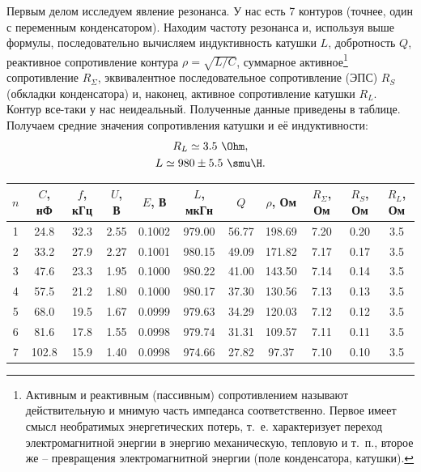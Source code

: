 \documentclass{../lab_class}
\begin{document}
Первым делом исследуем явление резонанса. У нас есть 7 контуров (точнее, один с переменным конденсатором). Находим частоту резонанса и, используя выше формулы, последовательно вычисляем индуктивность катушки $L$, добротность $Q$, реактивное сопротивление контура $\rho = \sqrt{L/C}$, суммарное активное\footnote{Активным и реактивным (пассивным) сопротивлением называют действительную и мнимую часть импеданса соответственно. Первое имеет смысл необратимых энергетических потерь, т.~е. характеризует переход электромагнитной энергии в энергию механическую, тепловую и т.~п., второе же -- превращения электромагнитной энергии (поле конденсатора, катушки).} сопротивление $R_\Sigma$, эквивалентное последовательное сопротивление (ЭПС) $R_S$ (обкладки конденсатора) и, наконец, активное сопротивление катушки $R_L$. Контур все-таки у нас неидеальный. Полученные данные приведены в таблице. Получаем средние значения сопротивления катушки и её индуктивности:
\begin{gather*}
	R_L \simeq 3.5 \ \Ohm, \\
	L \simeq 980 \pm 5.5 \ \smu \H.
\end{gather*}

\pagebreak

\begin{tabular}{|c|c|c|c|c|c|c|c|c|c|c|}
\hline
$n$ &  $C$, нФ &  $f$, кГц &  $U$, В &    $E$, В &  $L$, мкГн &      $Q$ &  $\rho$, Ом &  $R_\Sigma$, Ом &  $R_S$, Ом &  $R_L$, Ом \\
\hline
 1 &   24.8 &    32.3 &  2.55 &  0.1002 &   979.00 &  56.77 &   198.69 &         7.20 &     0.20 &      3.5 \\ \hline
 2 &   33.2 &    27.9 &  2.27 &  0.1001 &   980.15 &  49.09 &   171.82 &         7.17 &     0.17 &      3.5 \\ \hline
 3 &   47.6 &    23.3 &  1.95 &  0.1000 &   980.22 &  41.00 &   143.50 &         7.14 &     0.14 &      3.5 \\ \hline
 4 &   57.5 &    21.2 &  1.80 &  0.1000 &   980.17 &  37.30 &   130.56 &         7.13 &     0.13 &      3.5 \\ \hline
 5 &   68.0 &    19.5 &  1.67 &  0.0999 &   979.63 &  34.29 &   120.03 &         7.12 &     0.12 &      3.5 \\ \hline
 6 &   81.6 &    17.8 &  1.55 &  0.0998 &   979.74 &  31.31 &   109.57 &         7.11 &     0.11 &      3.5 \\ \hline
 7 &  102.8 &    15.9 &  1.40 &  0.0998 &   974.66 &  27.82 &    97.37 &         7.10 &     0.10 &      3.5 \\ \hline
\end{tabular}
\end{document}
